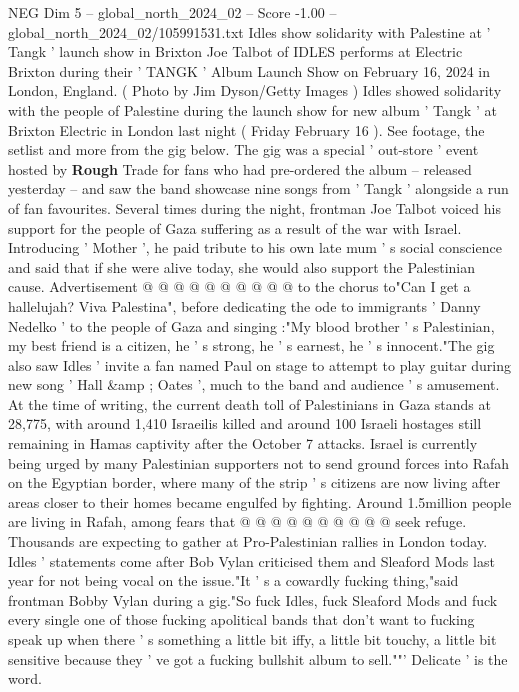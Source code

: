 \begin{textsample}{NEG Dim 5 – global\_north\_2024\_02 – Score -1.00 – global\_north\_2024\_02/105991531.txt}  \label{ex:f5_neg_214}
Idles show solidarity with Palestine at ' Tangk ' launch show in Brixton Joe Talbot of IDLES performs at Electric Brixton during their ' TANGK ' Album Launch Show on February 16, 2024 in London, England. ( Photo by Jim Dyson/Getty Images ) Idles showed solidarity with the people of Palestine during the launch show for new album ' Tangk ' at Brixton Electric in London last night ( Friday February 16 ).
See footage, the setlist and more from the gig below.
The gig was a special ' out-store ' event hosted by \textbf{Rough} Trade for fans who had pre-ordered the album -- released yesterday -- and saw the band showcase nine songs from ' Tangk ' alongside a run of fan favourites.
Several times during the night, frontman Joe Talbot voiced his support for the people of Gaza suffering as a result of the war with Israel.
Introducing ' Mother ', he paid tribute to his own late mum ' s social conscience and said that if she were alive today, she would also support the Palestinian cause.
Advertisement @ @ @ @ @ @ @ @ @ @ to the chorus to"Can I get a hallelujah?
Viva Palestina", before dedicating the ode to immigrants ' Danny Nedelko ' to the people of Gaza and singing :"My blood brother ' s Palestinian, my best friend is a citizen, he ' s strong, he ' s earnest, he ' s innocent."The gig also saw Idles ' invite a fan named Paul on stage to attempt to play guitar during new song ' Hall \&amp ; Oates ', much to the band and audience ' s amusement.
At the time of writing, the current death toll of Palestinians in Gaza stands at 28,775, with around 1,410 Israeilis killed and around 100 Israeli hostages still remaining in Hamas captivity after the October 7 attacks.
Israel is currently being urged by many Palestinian supporters not to send ground forces into Rafah on the Egyptian border, where many of the strip ' s citizens are now living after areas closer to their homes became engulfed by fighting.
Around 1.5million people are living in Rafah, among fears that @ @ @ @ @ @ @ @ @ @ seek refuge.
Thousands are expecting to gather at Pro-Palestinian rallies in London today.
Idles ' statements come after Bob Vylan criticised them and Sleaford Mods last year for not being vocal on the issue."It ' s a cowardly fucking thing,"said frontman Bobby Vylan during a gig."So fuck Idles, fuck Sleaford Mods and fuck every single one of those fucking apolitical bands that don't want to fucking speak up when there ' s something a little bit iffy, a little bit touchy, a little bit sensitive because they ' ve got a fucking bullshit album to sell.""' Delicate ' is the word.

\end{textsample}
